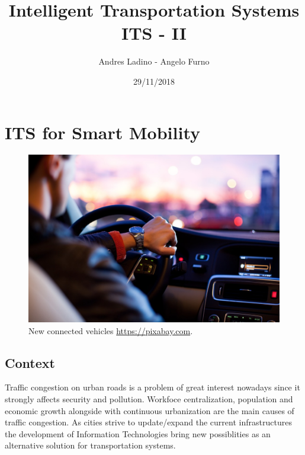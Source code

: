 \documentclass[]{book}
\title{Intelligent Transportation Systems ITS - II}
\author{Andres Ladino - Angelo Furno}
\date{29/11/2018}
\theoremstyle{definition}
\theoremstyle{definition}
\theoremstyle{definition}
\theoremstyle{remark}
\begin{document}
\maketitle

{
\hypersetup{linkcolor=black}
\setcounter{tocdepth}{1}
\tableofcontents
}
\hypertarget{its-for-smart-mobility}{%
\chapter*{ITS for Smart Mobility}\label{its-for-smart-mobility}}




\begin{figure}

{\centering \includegraphics{images/01-car} 

}

\caption{New connected vehicles
\href{Taken\%20from:\%20https://pixabay.com}{https://pixabay.com}.}\label{fig:car}
\end{figure}

\hypertarget{context}{%
\section*{Context}\label{context}}

Traffic congestion on urban roads is a problem of great interest
nowadays since it strongly affects security and pollution. Workfoce
centralization, population and economic growth alongside with continuous
urbanization are the main causes of traffic congestion. As cities strive
to update/expand the current infrastructures the development of
Information Technologies bring new possiblities as an alternative
solution for transportation systems.
\end{document}
